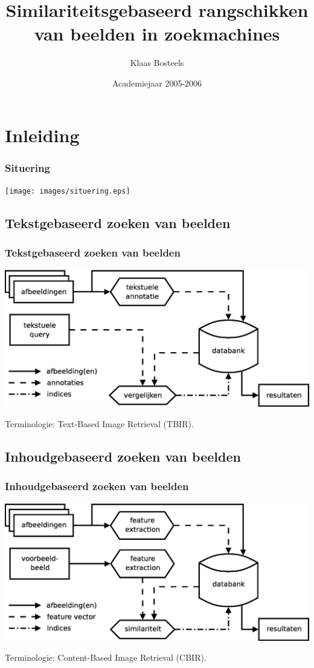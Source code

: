 \documentclass[dutch]{beamer}
\title{Similariteitsgebaseerd rangschikken van beelden in zoekmachines}
\author{Klaas Bosteels}
\date{Academiejaar 2005-2006}
\theoremstyle{definition}
\theoremstyle{remark}
\theoremstyle{example}
\begin{document}
\plainframe{\titlepage}

\section{Inleiding}
\frame
{
  \frametitle{Situering}
  
  \begin{center}
  \texttt{[image: images/situering.eps]}
  \end{center}
}
\subsection{Tekstgebaseerd zoeken van beelden}
\frame
{
  \frametitle{Tekstgebaseerd zoeken van beelden}

  \begin{center}
  \includegraphics[width=\textwidth]{images/tbir.eps}
  \end{center}

  Terminologie: Text-Based Image Retrieval (TBIR).
}
\subsection{Inhoudgebaseerd zoeken van beelden}
\frame
{
  \frametitle{Inhoudgebaseerd zoeken van beelden}

  \begin{center}
  \includegraphics[width=\textwidth]{images/cbir.eps}
  \end{center}

  Terminologie: Content-Based Image Retrieval (CBIR).
}
\end{document}
